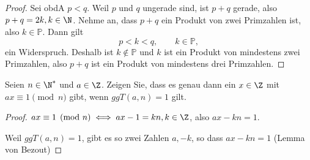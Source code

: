 \begin{proof}
	Sei obdA $p<q$. Weil $p$ und $q$ ungerade sind, ist $p+q$ gerade, also $p+q=2k, k\in \N$. Nehme an, dass $p+q$ ein Produkt von zwei Primzahlen ist, also $k\in \mathbb{P}$. Dann gilt
	\[
		p < k < q, \qquad k\in \mathbb{P}
	,\]
	ein Widerspruch. Deshalb ist $k\not\in \mathbb{P}$ und $k$ ist ein Produkt von mindestens zwei Primzahlen, also $p+q$ ist ein Produkt von mindestens drei Primzahlen. 
\end{proof}

\begin{Problem}
	Seien $n \in \N^*$ und $a \in \Z$. Zeigen Sie, dass es genau dann ein $x \in \Z$ mit $ax \equiv 1\pmod{n}$ gibt, wenn $ggT(a, n) = 1$ gilt.
\end{Problem}
\begin{proof}
	$ax\equiv 1\pmod{n}\iff ax-1=kn, k\in\Z$, also $ax-kn=1$.

	Weil $ggT(a,n)=1$, gibt es so zwei Zahlen $a, -k$, so dass $ax-kn=1$ (Lemma von Bezout)
\end{proof}
